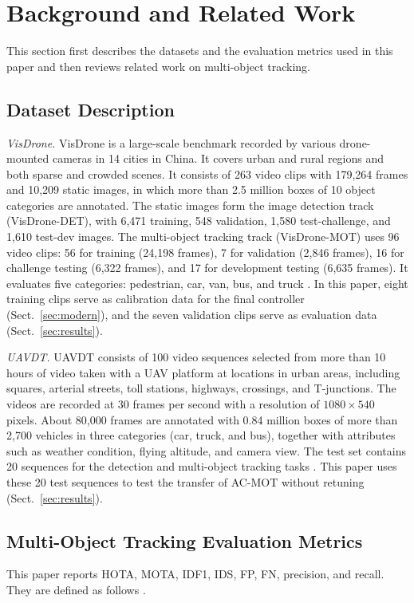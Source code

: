 \documentclass[pdflatex,sn-mathphys-num,iicol]{sn-jnl}
\begin{document}
\section{Background and Related Work}\label{sec:related}
This section first describes the datasets and the evaluation metrics used in
this paper and then reviews related work on multi-object tracking.

\subsection{Dataset Description}\label{sec:datasets}
\emph{VisDrone.} VisDrone \cite{zhu2022visdrone} is a large-scale benchmark
recorded by various drone-mounted cameras in 14 cities in China. It covers
urban and rural regions and both sparse and crowded scenes. It consists of 263
video clips with 179,264 frames and 10,209 static images, in which more than
2.5 million boxes of 10 object categories are annotated. The static images form
the image detection track (VisDrone-DET), with 6,471 training, 548
validation, 1,580 test-challenge, and 1,610 test-dev images. The
multi-object tracking track (VisDrone-MOT) uses 96 video clips: 56 for
training (24,198 frames), 7 for validation (2,846 frames), 16 for challenge
testing (6,322 frames), and 17 for development testing (6,635 frames). It
evaluates five categories: pedestrian, car, van, bus, and truck
\cite{zhu2022visdrone}. In this paper, eight training clips serve as
calibration data for the final controller (Sect.~\ref{sec:modern}), and the
seven validation clips serve as evaluation data (Sect.~\ref{sec:results}).

\emph{UAVDT.} UAVDT \cite{du2018uavdt} consists of 100 video sequences
selected from more than 10 hours of video taken with a UAV platform at
locations in urban areas, including squares, arterial streets, toll stations,
highways, crossings, and T-junctions. The videos are recorded at 30 frames per
second with a resolution of $1080\times540$ pixels. About 80,000 frames are
annotated with 0.84 million boxes of more than 2,700 vehicles in three
categories (car, truck, and bus), together with attributes such as weather
condition, flying altitude, and camera view. The test set contains 20
sequences for the detection and multi-object tracking tasks
\cite{du2018uavdt}. This paper uses these 20 test sequences to test the
transfer of AC-MOT without retuning (Sect.~\ref{sec:results}).

\subsection{Multi-Object Tracking Evaluation Metrics}\label{sec:metrics}
This paper reports HOTA, MOTA, IDF1, IDS, FP, FN, precision, and recall. They
are defined as follows \cite{dendorfer2021motchallenge,luiten2021hota}.
\end{document}
